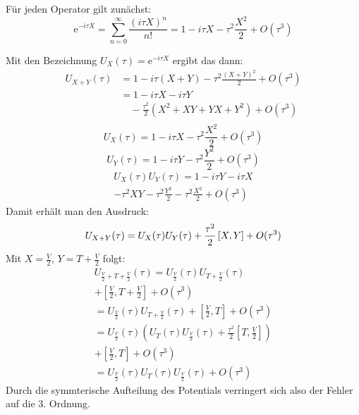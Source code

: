 \documentclass[10pt,a4paper,german]{scrartcl}
\begin{document}
		Für jeden Operator gilt zunächst:
		\begin{equation*}
			\mathrm{e}^{- i \tau X}
				= \sum_{n=0}^{\infty} \frac{(i \tau X)^n}{n!}
				= 1 - i \tau X - \tau^2 \frac{X^2}{2} + O(\tau^3)
		\end{equation*}
		
		Mit den Bezeichnung	$U_X(\tau)=\mathrm{e}^{-i \tau X}$ ergibt das dann:
		\begin{align*}
			U_{X+Y}(\tau) &= 1 - i \tau (X+Y) -\tau^2 \frac{(X+Y)^2}{2} + O(\tau^3)\\
							&= 1 - i \tau X - i \tau Y\\ 
							&\quad-\frac{\tau^2}{2} \left(	X^2 + X Y + Y X + Y^2 \right) + O(\tau^3)\\
		\end{align*}
		\begin{equation*}
			U_X(\tau) = 1 - i \tau X -\tau^2 \frac{X^2}{2} + O(\tau^3)
		\end{equation*}
		\begin{equation*}
			U_Y(\tau) = 1 - i \tau Y -\tau^2 \frac{Y^2}{2} + O(\tau^3)
		\end{equation*}
		\begin{multline*}
			U_X(\tau) U_Y(\tau) = 
				1
				- i \tau Y - i \tau X\\
				- \tau^2 X Y 
				- \tau^2 \frac{Y^2}{2}
				- \tau^2 \frac{X^2}{2}
				+ O(\tau^3)
		\end{multline*}
		Damit erhält man den Ausdruck:
		\begin{equation}\label{eq:expand}
			U_{X+Y}(\tau) = U_X(\tau)U_Y(\tau) 
				+ \frac{\tau^2}{2} \left[X,Y\right]	+ O(\tau^3)\\
		\end{equation}
		Mit $X=\frac{V}{2}$, $Y=T+\frac{V}{2}$ folgt:
		\begin{multline}
			U_{\frac{V}{2}+T+\frac{V}{2}}(\tau)
				= U_{\frac{V}{2}}(\tau)U_{T+\frac{V}{2}}(\tau) \\
					+ \left[\frac{V}{2},T+\frac{V}{2}\right]	+ O(\tau^3)\\
				= U_{\frac{V}{2}}(\tau)U_{T+\frac{V}{2}}(\tau) 
					+ \left[\frac{V}{2},T\right]	+ O(\tau^3)\\
				= U_{\frac{V}{2}}(\tau)
						\left(
							U_T(\tau)U_{\frac{V}{2}}(\tau)
								+ \frac{\tau^2}{2} \left[T,\frac{V}{2}\right]
						\right)\\
					+ \left[\frac{V}{2},T\right]	+ O(\tau^3)\\
				= U_{\frac{V}{2}}(\tau) U_T(\tau) U_{\frac{V}{2}}(\tau) + O(\tau^3)
		\end{multline}
		Durch die symmterische Aufteilung des Potentials verringert sich also
		der Fehler auf die 3. Ordnung.
		
\end{document}
